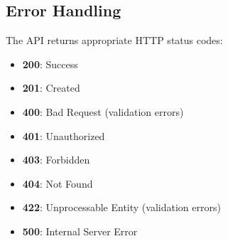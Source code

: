 \documentclass[12pt,a4paper]{article}
\begin{document}
\subsection{Error Handling}
The API returns appropriate HTTP status codes:
\begin{itemize}
    \item \textbf{200}: Success
    \item \textbf{201}: Created
    \item \textbf{400}: Bad Request (validation errors)
    \item \textbf{401}: Unauthorized
    \item \textbf{403}: Forbidden
    \item \textbf{404}: Not Found
    \item \textbf{422}: Unprocessable Entity (validation errors)
    \item \textbf{500}: Internal Server Error
\end{itemize}
\end{document}
